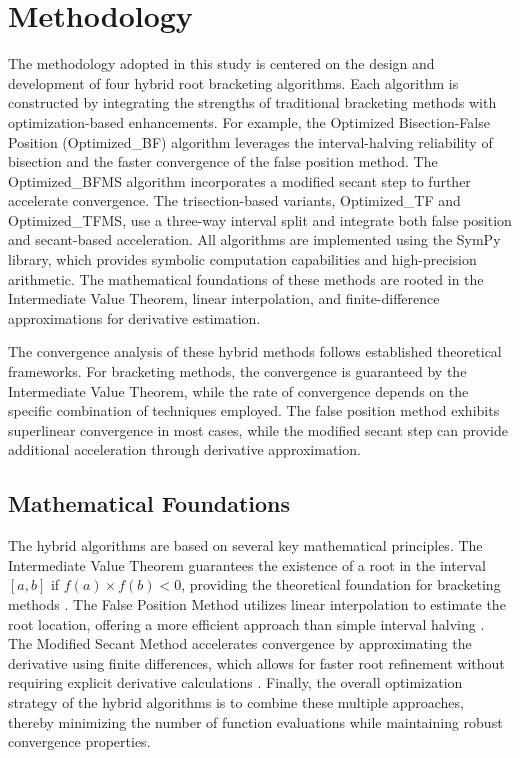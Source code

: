 \documentclass[amsmath, amssymb, aps]{revtex4-2}
\begin{document}
\section{Methodology}\label{sec:methodology}

The methodology adopted in this study is centered on the design and development of four hybrid root bracketing algorithms. Each algorithm is constructed by integrating the strengths of traditional bracketing methods with optimization-based enhancements. For example, the Optimized Bisection-False Position (Optimized\_BF) algorithm leverages the interval-halving reliability of bisection and the faster convergence of the false position method. The Optimized\_BFMS algorithm incorporates a modified secant step to further accelerate convergence. The trisection-based variants, Optimized\_TF and Optimized\_TFMS, use a three-way interval split and integrate both false position and secant-based acceleration. All algorithms are implemented using the SymPy library, which provides symbolic computation capabilities and high-precision arithmetic. The mathematical foundations of these methods are rooted in the Intermediate Value Theorem, linear interpolation, and finite-difference approximations for derivative estimation.

The convergence analysis of these hybrid methods follows established theoretical frameworks. For bracketing methods, the convergence is guaranteed by the Intermediate Value Theorem, while the rate of convergence depends on the specific combination of techniques employed. The false position method exhibits superlinear convergence in most cases, while the modified secant step can provide additional acceleration through derivative approximation.

\subsection{Mathematical Foundations}

The hybrid algorithms are based on several key mathematical principles. The Intermediate Value Theorem guarantees the existence of a root in the interval $[a, b]$ if $f(a) \times f(b) < 0$, providing the theoretical foundation for bracketing methods \cite{burden1985numerical}. The False Position Method utilizes linear interpolation to estimate the root location, offering a more efficient approach than simple interval halving \cite{harder2019numerical}. The Modified Secant Method accelerates convergence by approximating the derivative using finite differences, which allows for faster root refinement without requiring explicit derivative calculations \cite{mathews2004numerical}. Finally, the overall optimization strategy of the hybrid algorithms is to combine these multiple approaches, thereby minimizing the number of function evaluations while maintaining robust convergence properties.
\end{document}
